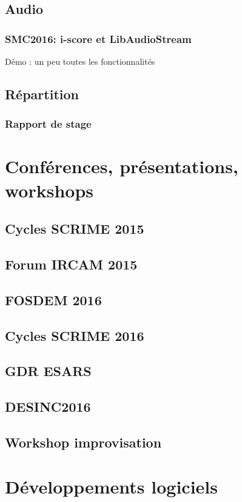 \documentclass[french,a4paper]{book}
\begin{document}
\subsection{Audio}
\subsubsection{SMC2016: i-score et LibAudioStream}
Démo : un peu toutes les fonctionnalités

\subsection{Répartition}
\subsubsection{Rapport de stage}

\section{Conférences, présentations, workshops}
\subsection{Cycles SCRIME 2015}
\subsection{Forum IRCAM 2015}
\subsection{FOSDEM 2016}
\subsection{Cycles SCRIME 2016}
\subsection{GDR ESARS}
\subsection{DESINC2016}
\subsection{Workshop improvisation}

\section{Développements logiciels}
\end{document}
